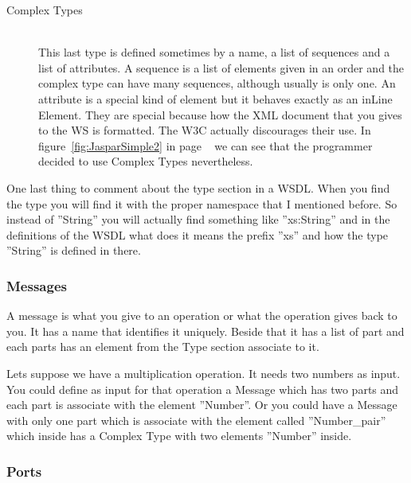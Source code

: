 \documentclass[a4paper,10pt]{article}
\begin{document}
\begin{description}
\begin{description}
	\item[Complex Types] \hfill \\

	This last type is defined sometimes by a name, a list of sequences and a list of attributes. A sequence is a list of elements given in an order and the complex type can have many sequences, although usually is only one. An attribute is a special kind of element but it behaves exactly as an inLine Element. They are special because how the XML document that you gives to the WS is formatted. The W3C actually discourages their use. In figure~\ref{fig:JasparSimple2} in page ~\pageref{fig:JasparSimple2} we can see that the programmer decided to use Complex Types nevertheless.

      \end{description}

    One last thing to comment about the type section in a WSDL. When you find the type you will find it with the proper namespace that I mentioned before. So instead of ''String'' you will actually find something like ''xs:String'' and in the definitions of the WSDL what does it means the prefix ''xs'' and how the type ''String'' is defined in there.

    \end{description}

    \subsubsection{Messages}

    A message is what you give to an operation or what the operation gives back to you. It has a name that identifies it uniquely. Beside that it has a list of part and each parts has an element from the Type section associate to it.\vspace{3 mm}

    Lets suppose we have a multiplication operation. It needs two numbers as input. You could define as input for that operation a Message which has two parts and each part is associate with the element ''Number''. Or you could have a Message with only one part which is associate with the element called ''Number\_pair'' which inside has a Complex Type with two elements ''Number'' inside. 

    \subsubsection{Ports}
\end{document}
